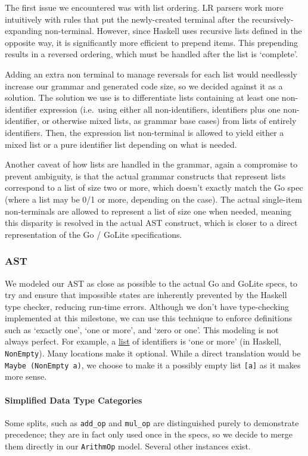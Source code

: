 \documentclass[11pt]{article}
\begin{document}
The first issue we encountered was with list ordering. LR parsers
work more intuitively with rules that put the newly-created terminal
after the recursively-expanding non-terminal. However, since Haskell
uses recursive lists defined in the opposite way, it is significantly
more efficient to prepend items. This prepending results in a reversed
ordering, which must be handled after the list is `complete'.

Adding an extra non terminal to manage reversals for each list would
needlessly increase our grammar and generated code size, so we decided
against it as a solution. The solution we use is to differentiate
lists containing at least one non-identifier expression (i.e.\ using either
all non-identifiers, identifiers plus one non-identifier, or otherwise mixed
lists, as grammar base cases) from lists of entirely identifiers. Then,
the expression list non-terminal is allowed to yield either a mixed list
or a pure identifier list depending on what is needed.

Another caveat of how lists are handled in the grammar, again a
compromise to prevent ambiguity, is that the actual grammar constructs
that represent lists correspond to a list of size two or more, which
doesn't exactly match the Go spec (where a list may be 0/1 or more,
depending on the case). The actual single-item non-terminals are allowed
to represent a list of size one when needed, meaning this disparity
is resolved in the actual AST construct, which is closer to a direct
representation of the Go / GoLite specifications.
\subsubsection{AST}
We modeled our AST as close as possible to the actual Go and
GoLite specs, to try and ensure that impossible states are inherently
prevented by the Haskell type checker, reducing run-time errors.
Although we don't have type-checking implemented at this milestone,
we can use this technique to enforce definitions such as
`exactly one', `one or more', and `zero or one'. This modeling is
not always perfect. For example, a \href{https://golang.org/ref/spec\#IdentifierList}{list}
of identifiers is `one or more' (in Haskell, \texttt{NonEmpty}). Many locations
make it optional. While a direct translation would be \texttt{Maybe (NonEmpty a)},
we choose to make it a possibly empty list \texttt{[a]} as it makes more sense.
\paragraph{Simplified Data Type Categories}
Some splits, such as \texttt{add\_op} and \texttt{mul\_op} are distinguished
purely to demonstrate precedence; they are in fact only used once
in the specs, so we decide to merge them directly in our \texttt{ArithmOp}
model. Several other instances exist.
\end{document}
